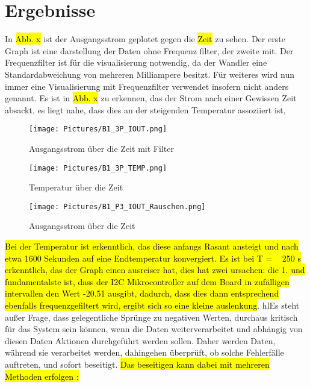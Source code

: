 \section{Ergebnisse}

\begin{flushleft}
In \hl{Abb. x} ist der Ausgangsstrom geplotet gegen die \hl{Zeit} zu sehen. Der erste Graph ist eine darstellung der Daten ohne Frequenz filter, der zweite mit. Der Frequenzfilter ist für die visualisierung notwendig, da der Wandler eine Standardabweichung von mehreren Milliampere besitzt. Für weiteres wird nun immer eine Visualisierung mit Frequenzfilter verwendet insofern nicht anders genannt. Es ist in \hl{Abb. x} zu erkennen, das der Strom nach einer Gewissen Zeit absackt, es liegt nahe, dass dies an der steigenden Temperatur assoziiert ist,
\end{flushleft}

\begin{figure}
    \centering
    \texttt{[image: Pictures/B1\_3P\_IOUT.png]}
    \caption{Ausgangsstrom über die Zeit mit Filter}
\end{figure}


\begin{figure}
    \centering
    \texttt{[image: Pictures/B1\_3P\_TEMP.png]}
    \caption{Temperatur über die Zeit}
\end{figure}

\begin{figure}
    \centering
    \texttt{[image: Pictures/B1\_P3\_IOUT\_Rauschen.png]}
    \caption{Ausgangsstrom über die Zeit}
\end{figure}

\begin{flushleft}
\hl{Bei der Temperatur ist erkenntlich, das diese anfangs Rasant ansteigt und nach etwa 1600 Sekunden auf eine Endtemperatur konvergiert. Es ist bei T = ~ 250 s erkenntlich, das der Graph einen ausreiser hat, dies hat zwei ursachen: die 1. und fundamentalste ist, dass der I2C Mikrocontroller auf dem Board in zufälligen intervallen den Wert -20.51 ausgibt, dadurch, dass dies dann entsprechend ebenfalls frequenzgefiltert wird, ergibt sich so eine kleine auslenkung}. hl{Es steht außer Frage, dass gelegentliche Sprünge zu negativen Werten, durchaus kritisch für das System sein können, wenn die Daten weiterverarbeitet und abhängig von diesen Daten Aktionen durchgeführt werden sollen. } Daher werden Daten, während sie verarbeitet werden, dahingehen überprüft, ob solche Fehlerfälle auftreten, und sofort beseitigt. \hl{Das beseitigen kann dabei mit mehreren Methoden erfolgen : }
\end{flushleft}


